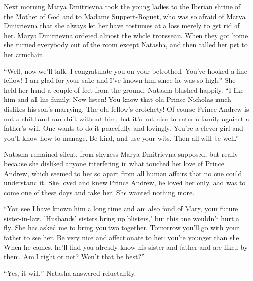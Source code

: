 Next morning Marya Dmitrievna took the young ladies to the
Iberian shrine of the Mother of God and to Madame Suppert-Roguet,
who was so afraid of Marya Dmitrievna that she always let her
have costumes at a loss merely to get rid of her. Marya
Dmitrievna ordered almost the whole trousseau. When they got home
she turned everybody out of the room except Natasha, and then
called her pet to her armchair.

``Well, now we'll talk. I congratulate you on your
betrothed. You've hooked a fine fellow! I am glad for your sake
and I've known him since he was so high.'' She held her hand a
couple of feet from the ground.  Natasha blushed happily. ``I
like him and all his family. Now listen! You know that old Prince
Nicholas much dislikes his son's marrying. The old fellow's
crotchety! Of course Prince Andrew is not a child and can shift
without him, but it's not nice to enter a family against a
father's will. One wants to do it peacefully and lovingly. You're
a clever girl and you'll know how to manage. Be kind, and use
your wits. Then all will be well.''

Natasha remained silent, from shyness Marya Dmitrievna supposed,
but really because she disliked anyone interfering in what
touched her love of Prince Andrew, which seemed to her so apart
from all human affairs that no one could understand it. She loved
and knew Prince Andrew, he loved her only, and was to come one of
these days and take her. She wanted nothing more.

``You see I have known him a long time and am also fond of Mary,
your future sister-in-law. 'Husbands' sisters bring up blisters,'
but this one wouldn't hurt a fly. She has asked me to bring you
two together.  Tomorrow you'll go with your father to see her. Be
very nice and affectionate to her: you're younger than she. When
he comes, he'll find you already know his sister and father and
are liked by them. Am I right or not? Won't that be best?''

``Yes, it will,'' Natasha answered reluctantly.


